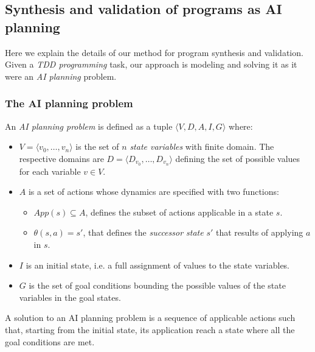 \documentclass[10pt,a4paper]{paper}
\newcommand{\tup}[1]{{\langle #1 \rangle}}
\begin{document}
\subsection{Synthesis and validation of programs as AI planning}
Here we explain the details of our method for program synthesis and validation. Given a {\em TDD programming} task, our approach is modeling and solving it as it were an {\em AI planning} problem.

\subsubsection{The AI planning problem}
An {\em AI planning problem} is defined as a tuple $\tup{V,D,A,I,G}$ where:
\begin{itemize}
\item $V=\tup{v_0, \ldots, v_n}$ is the set of $n$ {\em state variables} with finite domain. The respective domains are $D=\tup{D_{v_0}, \ldots, D_{v_n}}$ defining the set of possible values for each variable $v\in V$.
\item $A$ is a set of actions whose dynamics are specified with two functions:
\begin{itemize}
\item $App(s)\subseteq A$, defines the subset of actions applicable in a state $s$.
\item $\theta(s,a)=s'$, that defines the {\em successor state} $s'$ that results of applying $a$ in $s$.
\end{itemize}  
\item $I$ is an initial state, i.e. a full assignment of values to the state variables.
\item $G$ is the set of goal conditions bounding the possible values of the state variables in the goal states.  
\end{itemize}
A solution to an AI planning problem is a sequence of applicable actions such that, starting from the initial state, its application reach a state where all the goal conditions are met.
\end{document}
